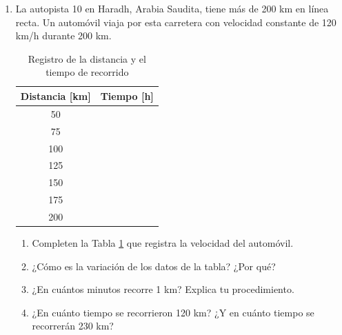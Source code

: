 \documentclass[11pt]{book}
\begin{document}
\begin{enumerate}
  \item La autopista 10 en Haradh, Arabia Saudita, tiene más de 200
        km en línea recta. Un automóvil viaja por esta carretera con
        velocidad constante de 120 km/h durante 200 km.
        \begin{table}[!h]
          \centering
          \begin{tabular}{|c|c|}
            \hline
            Distancia [km] & Tiempo [h] \\
            \hline\rowcolor{colorrds!20}
            50             &            \\
            \hline
            75             &            \\
            \hline\rowcolor{colorrds!20}
            100            &            \\
            \hline
            125            &            \\
            \hline\rowcolor{colorrds!20}
            150            &            \\
            \hline
            175            &            \\
            \hline\rowcolor{colorrds!20}
            200            &            \\
            \hline
          \end{tabular}
          \caption{Registro de la distancia y el tiempo de recorrido}
          \label{tab:arabia}
        \end{table}
        \begin{enumerate}
          \item Completen la Tabla \ref{tab:arabia} que registra la velocidad del automóvil.
          \item ¿Cómo es la variación de los datos de la tabla? ¿Por qué?
          \item ¿En cuántos minutos recorre 1 km? Explica tu procedimiento.
          \item ¿En cuánto tiempo se recorrieron 120 km? ¿Y en cuánto tiempo se recorrerán 230 km?
        \end{enumerate}


\end{enumerate}
\end{document}
